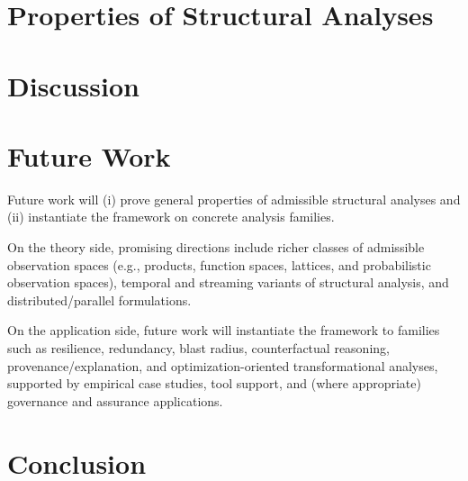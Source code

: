\documentclass[11pt]{article}
\begin{document}
\section{Properties of Structural Analyses}
\label{sec:analysis-properties}

\section{Discussion}
\label{sec:discussion}

\section{Future Work}
\label{sec:future-work}
Future work will (i) prove general properties of admissible structural analyses and (ii) instantiate the framework on concrete analysis families.

On the theory side, promising directions include richer classes of admissible observation spaces (e.g., products, function spaces, lattices, and probabilistic observation spaces), temporal and streaming variants of structural analysis, and distributed/parallel formulations.

On the application side, future work will instantiate the framework to families such as resilience, redundancy, blast radius, counterfactual reasoning, provenance/explanation, and optimization-oriented transformational analyses, supported by empirical case studies, tool support, and (where appropriate) governance and assurance applications.

\section{Conclusion}
\label{sec:conclusion}

\appendix
\end{document}
